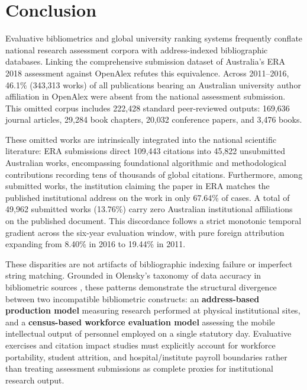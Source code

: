 \section{Conclusion}\label{sec:conclusion}

Evaluative bibliometrics and global university ranking systems frequently conflate national research assessment corpora with address-indexed bibliographic databases. Linking the comprehensive submission dataset of Australia's ERA 2018 assessment against OpenAlex refutes this equivalence. Across 2011--2016, 46.1\% (343,313 works) of all publications bearing an Australian university author affiliation in OpenAlex were absent from the national assessment submission. This omitted corpus includes 222,428 standard peer-reviewed outputs: 169,636 journal articles, 29,284 book chapters, 20,032 conference papers, and 3,476 books.

These omitted works are intrinsically integrated into the national scientific literature: ERA submissions direct 109,443 citations into 45,822 unsubmitted Australian works, encompassing foundational algorithmic and methodological contributions recording tens of thousands of global citations. Furthermore, among submitted works, the institution claiming the paper in ERA matches the published institutional address on the work in only 67.64\% of cases. A total of 49,962 submitted works (13.76\%) carry zero Australian institutional affiliations on the published document. This discordance follows a strict monotonic temporal gradient across the six-year evaluation window, with pure foreign attribution expanding from 8.40\% in 2016 to 19.44\% in 2011.

These disparities are not artifacts of bibliographic indexing failure or imperfect string matching. Grounded in Olensky's taxonomy of data accuracy in bibliometric sources \cite{olenskyDataAccuracyBibliometric2015}, these patterns demonstrate the structural divergence between two incompatible bibliometric constructs: an \textbf{address-based production model} measuring research performed at physical institutional sites, and a \textbf{census-based workforce evaluation model} assessing the mobile intellectual output of personnel employed on a single statutory day. Evaluative exercises and citation impact studies must explicitly account for workforce portability, student attrition, and hospital/institute payroll boundaries rather than treating assessment submissions as complete proxies for institutional research output.
